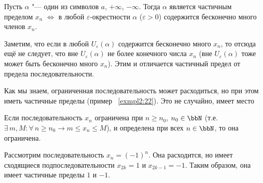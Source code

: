 
\begin{thm} \label{th2:7}
Пусть $\alpha$ "--- один из символов $a$, $+\infty$, $-\infty$. Тогда $\alpha$ является частичным пределом $x_n$ $\iff$ в любой $\varepsilon$-окрестности $\alpha$ ($\varepsilon > 0$) содержится бесконечно много членов $x_n$.
\end{thm}

\begin{notion}
Заметим, что если в любой $U_\varepsilon(\alpha)$ содержится бесконечно много $x_n$, то отсюда ещё не следует, что вне $U_\varepsilon(\alpha)$ не более конечного числа $x_n$ (вне $U_\varepsilon(\alpha)$ тоже может быть бесконечно много $x_n$). Этим и отличается частичный предел от предела последовательности.
\end{notion}

Как мы знаем, ограниченная последовательность может расходиться, но при этом иметь частичные пределы (пример ~\ref{exmpl2:22}). Это не случайно, имеет место


\begin{lemm} \label{th2:3_b}
Если последовательность $x_n$ ограничена при $n \ge n_0$, $n_0 \in \bbN$ (т.е. $\exists\, m, M \colon \forall\, n \ge n_0 \longrightarrow m \le x_n \le M$), и определена при всех $n \in \bbN$, то она ограничена.
\end{lemm}


\begin{exmpl} \label{exmpl2:22}
Рассмотрим последовательность $x_n = (-1)^n$. Она расходится, но имеет сходящиеся подпоследовательности $x_{2k} = 1$ и $x_{2k-1} = -1$. Таким образом, она имеет частичные пределы $1$ и $-1$.
\end{exmpl}

